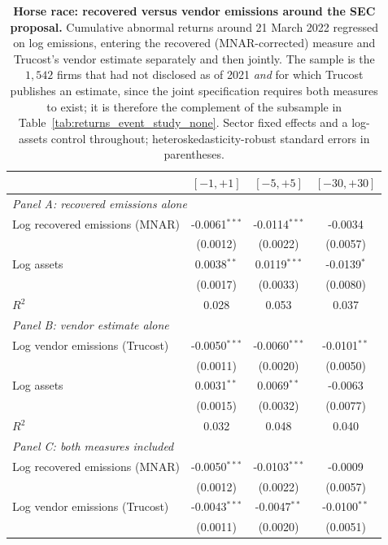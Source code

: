 \documentclass[a4paper,12pt]{article}
\begin{document}
\begin{table}[htbp]
\footnotesize\centering
\caption{\textbf{Horse race: recovered versus vendor emissions around the SEC
proposal.} Cumulative abnormal returns around 21 March 2022 regressed on log
emissions, entering the recovered (MNAR-corrected) measure and Trucost's vendor
estimate separately and then jointly. The sample is the $1{,}542$ firms that had
not disclosed as of 2021 \emph{and} for which Trucost publishes an estimate, since
the joint specification requires both measures to exist; it is therefore the
complement of the subsample in Table~\ref{tab:returns_event_study_none}. Sector
fixed effects and a log-assets control throughout; heteroskedasticity-robust
standard errors in parentheses.}
\label{tab:returns_event_study_trucost_vs_mnar_main}
\begin{tabular}{lccc}
\toprule
 & $[-1,+1]$ & $[-5,+5]$ & $[-30,+30]$ \\
\midrule
\multicolumn{4}{l}{\emph{Panel A: recovered emissions alone}} \\[2pt]
Log recovered emissions (MNAR) & -0.0061$^{***}$ & -0.0114$^{***}$ & -0.0034 \\
 & (0.0012) & (0.0022) & (0.0057) \\
Log assets & 0.0038$^{**}$ & 0.0119$^{***}$ & -0.0139$^{*}$ \\
 & (0.0017) & (0.0033) & (0.0080) \\
$R^2$ & 0.028 & 0.053 & 0.037 \\
\midrule
\multicolumn{4}{l}{\emph{Panel B: vendor estimate alone}} \\[2pt]
Log vendor emissions (Trucost) & -0.0050$^{***}$ & -0.0060$^{***}$ & -0.0101$^{**}$ \\
 & (0.0011) & (0.0020) & (0.0050) \\
Log assets & 0.0031$^{**}$ & 0.0069$^{**}$ & -0.0063 \\
 & (0.0015) & (0.0032) & (0.0077) \\
$R^2$ & 0.032 & 0.048 & 0.040 \\
\midrule
\multicolumn{4}{l}{\emph{Panel C: both measures included}} \\[2pt]
Log recovered emissions (MNAR) & -0.0050$^{***}$ & -0.0103$^{***}$ & -0.0009 \\
 & (0.0012) & (0.0022) & (0.0057) \\
Log vendor emissions (Trucost) & -0.0043$^{***}$ & -0.0047$^{**}$ & -0.0100$^{**}$ \\
 & (0.0011) & (0.0020) & (0.0051) \\

\end{tabular}
\end{table}
\end{document}
